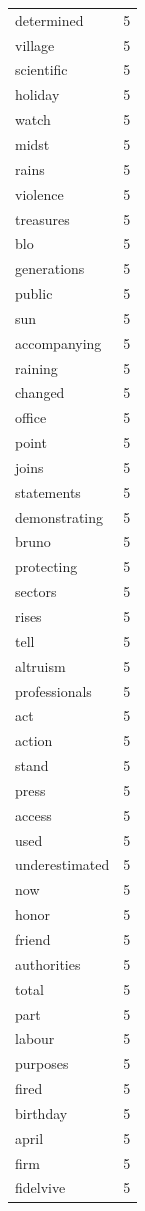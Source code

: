 \begin{tabular}{lr}
determined & 5 \\
village & 5 \\
scientific & 5 \\
holiday & 5 \\
watch & 5 \\
midst & 5 \\
rains & 5 \\
violence & 5 \\
treasures & 5 \\
blo & 5 \\
generations & 5 \\
public & 5 \\
sun & 5 \\
accompanying & 5 \\
raining & 5 \\
changed & 5 \\
office & 5 \\
point & 5 \\
joins & 5 \\
statements & 5 \\
demonstrating & 5 \\
bruno & 5 \\
protecting & 5 \\
sectors & 5 \\
rises & 5 \\
tell & 5 \\
altruism & 5 \\
professionals & 5 \\
act & 5 \\
action & 5 \\
stand & 5 \\
press & 5 \\
access & 5 \\
used & 5 \\
underestimated & 5 \\
now & 5 \\
honor & 5 \\
friend & 5 \\
authorities & 5 \\
total & 5 \\
part & 5 \\
labour & 5 \\
purposes & 5 \\
fired & 5 \\
birthday & 5 \\
april & 5 \\
firm & 5 \\
fidelvive & 5 \\

\end{tabular}
